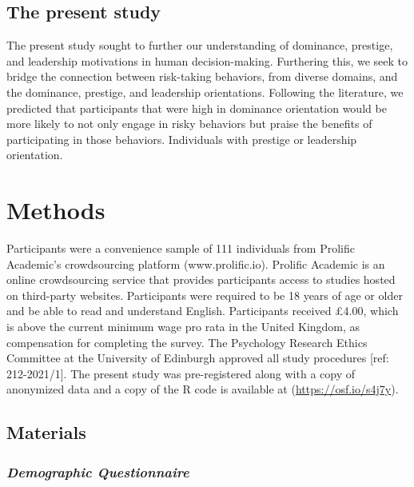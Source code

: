 \documentclass[
  english,
  ,doc, 12pt, a4paper,floatsintext]{apa7}
\begin{document}
\hypertarget{the-present-study}{%
\subsection{The present study}\label{the-present-study}}

The present study sought to further our understanding of dominance, prestige, and leadership motivations in human decision-making. Furthering this, we seek to bridge the connection between risk-taking behaviors, from diverse domains, and the dominance, prestige, and leadership orientations. Following the literature, we predicted that participants that were high in dominance orientation would be more likely to not only engage in risky behaviors but praise the benefits of participating in those behaviors. Individuals with prestige or leadership orientation.

\hypertarget{methods}{%
\section{Methods}\label{methods}}

Participants were a convenience sample of 111 individuals from Prolific Academic's crowdsourcing platform (www.prolific.io). Prolific Academic is an online crowdsourcing service that provides participants access to studies hosted on third-party websites. Participants were required to be 18 years of age or older and be able to read and understand English. Participants received £4.00, which is above the current minimum wage pro rata in the United Kingdom, as compensation for completing the survey. The Psychology Research Ethics Committee at the University of Edinburgh approved all study procedures {[}ref: 212-2021/1{]}. The present study was pre-registered along with a copy of anonymized data and a copy of the R code is available at (\url{https://osf.io/s4j7y}).

\hypertarget{materials}{%
\subsection{Materials}\label{materials}}

\hypertarget{demographic-questionnaire}{%
\subsubsection{\texorpdfstring{\emph{Demographic Questionnaire}}{Demographic Questionnaire}}\label{demographic-questionnaire}}
\end{document}
